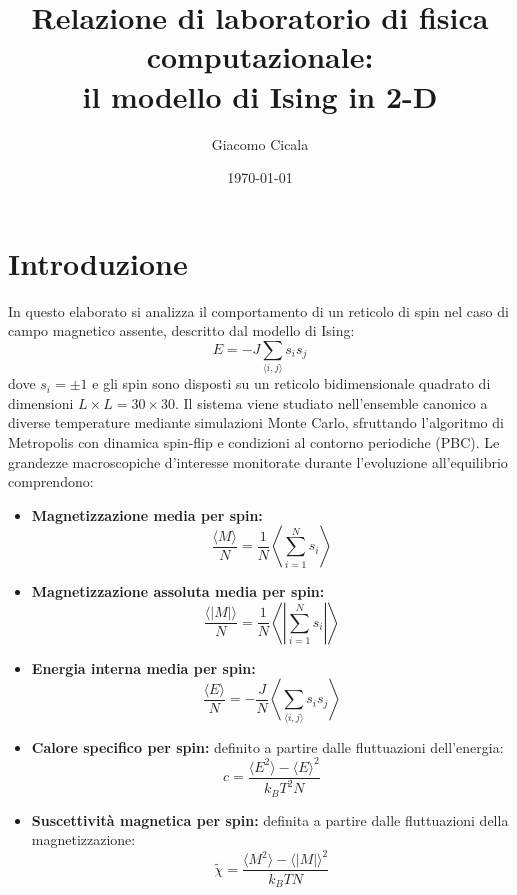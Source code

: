 \documentclass[12pt,a4paper, italian]{article}
\title{Relazione di laboratorio di fisica computazionale:\\ il modello di Ising in 2-D}
\author{Giacomo Cicala}
\date{\today}
\begin{document}
\maketitle


\section{Introduzione}
In questo elaborato si analizza il comportamento di un reticolo di spin nel caso di campo magnetico assente, descritto dal modello di Ising:
\begin{equation}
    E = -J \sum_{\langle i,j \rangle} s_i s_j
\end{equation}
dove $s_i = \pm 1$ e gli spin sono disposti su un reticolo bidimensionale quadrato di dimensioni $L \times L = 30 \times 30$.
Il sistema viene studiato nell'ensemble canonico a diverse temperature mediante simulazioni Monte Carlo, sfruttando l'algoritmo di Metropolis con dinamica spin-flip e condizioni al contorno periodiche (PBC). Le grandezze macroscopiche d'interesse monitorate durante l'evoluzione all'equilibrio comprendono:

\begin{itemize}
    \item \textbf{Magnetizzazione media per spin:}
          \begin{equation}
              \frac{\langle M \rangle}{N} = \frac{1}{N} \left\langle \sum_{i=1}^{N} s_i \right\rangle
          \end{equation}

    \item \textbf{Magnetizzazione assoluta media per spin:}
          \begin{equation}
              \frac{\langle |M| \rangle}{N} = \frac{1}{N} \left\langle \left| \sum_{i=1}^{N} s_i \right| \right\rangle
          \end{equation}

    \item \textbf{Energia interna media per spin:}
          \begin{equation}
              \frac{\langle E \rangle}{N} = -\frac{J}{N} \left\langle \sum_{\langle i,j \rangle} s_i s_j \right\rangle
          \end{equation}

    \item \textbf{Calore specifico per spin:} definito a partire dalle fluttuazioni dell'energia:
          \begin{equation}
              c = \frac{\langle E^2 \rangle - \langle E \rangle^2}{k_B T^2 N}
          \end{equation}

    \item \textbf{Suscettività magnetica per spin:} definita a partire dalle fluttuazioni della magnetizzazione:
          \begin{equation}
              \tilde{\chi} = \frac{\langle M^2 \rangle - \langle |M| \rangle^2}{k_B T N}
          \end{equation}
\end{itemize}
\end{document}
